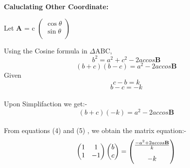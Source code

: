 \documentclass{article}
\let\vec\mathbf
\begin{document}
\raggedright\textbf{Caluclating Other Coordinate: } \\
  \raggedright Let $\vec{A}$ = c
  $\begin{pmatrix} 
 \cos \theta\\
  \sin\theta \\
\end{pmatrix}$ \\
\raggedright Using the Cosine formula in  $\Delta$ABC, \\ \vspace{3mm}
\begin{equation}
{b}^2 = {a}^2 + {c}^2 - 2accos\vec{B}
\end{equation}
\begin{equation}
(b+c)(b-c) = {a}^2- 2accos\vec{B}
\end{equation}
Given
\begin{equation}
        c-b=k
	\end{equation}
  \begin{equation}
        b-c=-k
 \end{equation}\\
Upon Simplifaction we get:- \\
\begin{equation}
(b+c)(-k) = {a}^2- 2accos\vec{B}
\end{equation} \\
\pagebreak
     From equations (4) and (5) , we obtain the matrix equation:- \\ \vspace{3mm}
     \begin{equation}
        \begin{pmatrix}
	   1 & 1  \\	
	   1 & -1    \\
        \end{pmatrix}
        \begin{pmatrix}
            b \\
            c \\
        \end{pmatrix}
           =
           \begin{pmatrix}
		   \frac{-a^2+2accos\vec{B}}{k} \vspace{3mm}\\
            -k \\
        \end{pmatrix}   
\end{equation}	     
        \vspace{5mm}            
\end{document}
